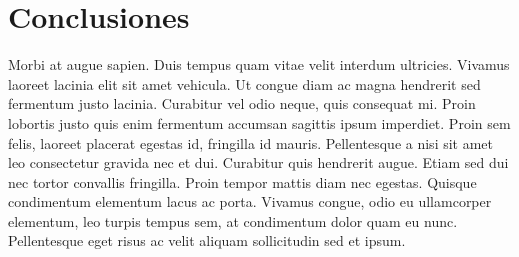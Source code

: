 \section{Conclusiones}

Morbi at augue sapien. Duis tempus quam vitae velit interdum ultricies. Vivamus laoreet lacinia elit sit amet vehicula. Ut congue diam ac magna hendrerit sed fermentum justo lacinia. Curabitur vel odio neque, quis consequat mi. Proin lobortis justo quis enim fermentum accumsan sagittis ipsum imperdiet. Proin sem felis, laoreet placerat egestas id, fringilla id mauris. Pellentesque a nisi sit amet leo consectetur gravida nec et dui. Curabitur quis hendrerit augue. Etiam sed dui nec tortor convallis fringilla. Proin tempor mattis diam nec egestas. Quisque condimentum elementum lacus ac porta. Vivamus congue, odio eu ullamcorper elementum, leo turpis tempus sem, at condimentum dolor quam eu nunc. Pellentesque eget risus ac velit aliquam sollicitudin sed et ipsum. 









